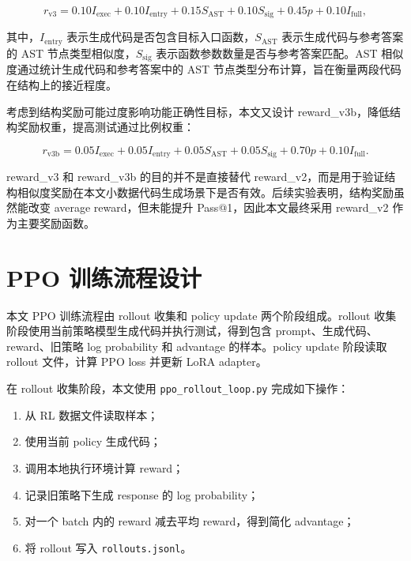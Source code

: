 \begin{equation}
  r_{\mathrm{v3}}
  =0.10 I_{\mathrm{exec}}
  +0.10 I_{\mathrm{entry}}
  +0.15 S_{\mathrm{AST}}
  +0.10 S_{\mathrm{sig}}
  +0.45 p
  +0.10 I_{\mathrm{full}},
\end{equation}

其中，$I_{\mathrm{entry}}$ 表示生成代码是否包含目标入口函数，$S_{\mathrm{AST}}$ 表示生成代码与参考答案的 AST 节点类型相似度，$S_{\mathrm{sig}}$ 表示函数参数数量是否与参考答案匹配。AST 相似度通过统计生成代码和参考答案中的 AST 节点类型分布计算，旨在衡量两段代码在结构上的接近程度。

考虑到结构奖励可能过度影响功能正确性目标，本文又设计 reward\_v3b，降低结构奖励权重，提高测试通过比例权重：

\begin{equation}
  r_{\mathrm{v3b}}
  =0.05 I_{\mathrm{exec}}
  +0.05 I_{\mathrm{entry}}
  +0.05 S_{\mathrm{AST}}
  +0.05 S_{\mathrm{sig}}
  +0.70 p
  +0.10 I_{\mathrm{full}}.
\end{equation}

reward\_v3 和 reward\_v3b 的目的并不是直接替代 reward\_v2，而是用于验证结构相似度奖励在本文小数据代码生成场景下是否有效。后续实验表明，结构奖励虽然能改变 average reward，但未能提升 Pass@1，因此本文最终采用 reward\_v2 作为主要奖励函数。

\section{PPO 训练流程设计}

本文 PPO 训练流程由 rollout 收集和 policy update 两个阶段组成。rollout 收集阶段使用当前策略模型生成代码并执行测试，得到包含 prompt、生成代码、reward、旧策略 log probability 和 advantage 的样本。policy update 阶段读取 rollout 文件，计算 PPO loss 并更新 LoRA adapter。

在 rollout 收集阶段，本文使用 \texttt{ppo\_rollout\_loop.py} 完成如下操作：

\begin{enumerate}
  \item 从 RL 数据文件读取样本；
  \item 使用当前 policy 生成代码；
  \item 调用本地执行环境计算 reward；
  \item 记录旧策略下生成 response 的 log probability；
  \item 对一个 batch 内的 reward 减去平均 reward，得到简化 advantage；
  \item 将 rollout 写入 \texttt{rollouts.jsonl}。
\end{enumerate}

